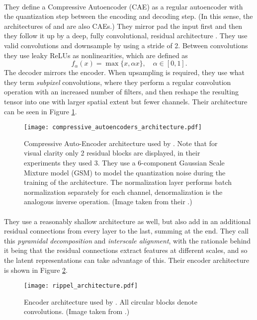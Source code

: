 \paragraph{\cite{theis2017lossy}} They define a Compressive Autoencoder (CAE) as a regular
autoencoder with the quantization step between the encoding and decoding step.
(In this sense, the architectures of \cite{balle2016end} and
\cite{balle2018variational} are also CAEs.) They mirror pad the input first
and then they follow it up by a deep, fully convolutional, residual
architecture \cite{he2016deep}. They use valid convolutions and downsample by
using a stride of 2. Between convolutions they use leaky ReLUs as
nonlinearities, which are defined as 
\[
  f_\alpha(x) = \max\{x, \alpha x\}, \quad \alpha \in [0, 1].
\]
The decoder mirrors the encoder. When upsampling is required, they use what
they term \textit{subpixel} convolutions, where they perform a regular
convolution operation with an increased number of filters, and then reshape
the resulting tensor into one with larger spatial extent but fewer channels.
Their architecture can be seen in Figure \ref{fig:comp_auto_arch}.
\begin{figure}
  \centering 
  \texttt{[image: compressive\_autoencoders\_architecture.pdf]}
  \caption{Compressive Auto-Encoder architecture used by \cite{theis2017lossy}.
    Note that for visual clarity only 2 residual blocks are displayed,
    in their experiments they used 3. They use a 6-component Gaussian Scale
    Mixture model (GSM) to model the quantization noise during the training of
    the architecture. The normalization layer performs batch normalization
    separately for each channel, denormalization is the analogous inverse
    operation. (Image taken from their \cite{theis2017lossy}.)}
  \label{fig:comp_auto_arch}
\end{figure}

\paragraph{\cite{rippel2017real}} They use a reasonably shallow architecture as well,
but also add in an additional residual connections from every layer to the last,
summing at the end. They call this
\textit{pyramidal decomposition} and \textit{interscale alignment}, with the
rationale behind it being that the residual connections extract features at
different scales, and so the latent representations can take advantage of this.
Their encoder architecture is shown in Figure \ref{fig:rippel_arch}.
\begin{figure}
  \centering 
  \texttt{[image: rippel\_architecture.pdf]}
  \caption{Encoder architecture used by \cite{rippel2017real}. All circular blocks
    denote convolutions. (Image taken from \cite{rippel2017real}.)}
  \label{fig:rippel_arch}
\end{figure}
